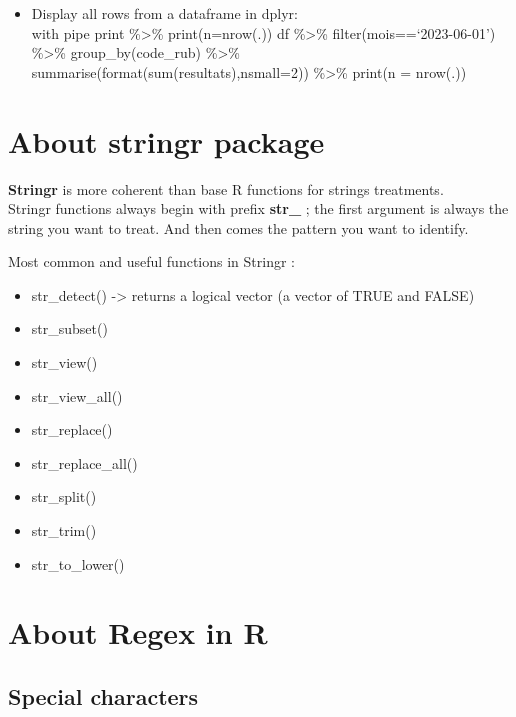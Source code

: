 \documentclass[
]{book}
\providecommand{\tightlist}{%
  \setlength{\itemsep}{0pt}\setlength{\parskip}{0pt}}
\begin{document}
\begin{itemize}
\tightlist
\item
  Display all rows from a dataframe in dplyr:\\
  with pipe print \%\textgreater\% print(n=nrow(.))
  df \%\textgreater\% filter(mois==`2023-06-01') \%\textgreater\% group\_by(code\_rub) \%\textgreater\% summarise(format(sum(resultats),nsmall=2)) \%\textgreater\% print(n = nrow(.))
\end{itemize}

\hypertarget{about-stringr-package}{%
\section{About stringr package}\label{about-stringr-package}}

\textbf{Stringr} is more coherent than base R functions for strings treatments.\\
Stringr functions always begin with prefix \textbf{str\_} ; the first argument is always the string you want to treat. And then comes the pattern you want to identify.

Most common and useful functions in Stringr :

\begin{itemize}
\tightlist
\item
  str\_detect() -\textgreater{} returns a logical vector (a vector of TRUE and FALSE)
\item
  str\_subset()
\item
  str\_view()
\item
  str\_view\_all()
\item
  str\_replace()
\item
  str\_replace\_all()
\item
  str\_split()
\item
  str\_trim()
\item
  str\_to\_lower()
\end{itemize}

\hypertarget{about-regex-in-r}{%
\section{About Regex in R}\label{about-regex-in-r}}

\hypertarget{special-characters}{%
\subsection{Special characters}\label{special-characters}}
\end{document}
